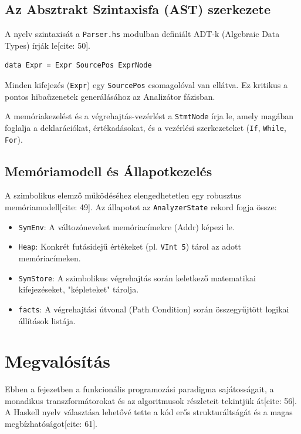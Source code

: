 \documentclass[
    hungarian,
    parspace
]{elteikthesis}
\begin{document}
\section{Az Absztrakt Szintaxisfa (AST) szerkezete}
A nyelv szintaxisát a \texttt{Parser.hs} modulban definiált ADT-k (Algebraic Data Types) írják le[cite: 50]. 

\begin{verbatim}
data Expr = Expr SourcePos ExprNode
\end{verbatim}
Minden kifejezés (\texttt{Expr}) egy \texttt{SourcePos} csomagolóval van ellátva. Ez kritikus a pontos hibaüzenetek generálásához az Analizátor fázisban.

A memóriakezelést és a végrehajtás-vezérlést a \texttt{StmtNode} írja le, amely magában foglalja a deklarációkat, értékadásokat, és a vezérlési szerkezeteket (\texttt{If}, \texttt{While}, \texttt{For}).

\section{Memóriamodell és Állapotkezelés}
A szimbolikus elemző működéséhez elengedhetetlen egy robusztus memóriamodell[cite: 49]. Az állapotot az \texttt{AnalyzerState} rekord fogja össze:
\begin{itemize}
    \item \texttt{SymEnv}: A változóneveket memóriacímekre (Addr) képezi le.
    \item \texttt{Heap}: Konkrét futásidejű értékeket (pl. \texttt{VInt 5}) tárol az adott memóriacímeken.
    \item \texttt{SymStore}: A szimbolikus végrehajtás során keletkező matematikai kifejezéseket, "képleteket" tárolja.
    \item \texttt{facts}: A végrehajtási útvonal (Path Condition) során összegyűjtött logikai állítások listája.
\end{itemize}

\chapter{Megvalósítás}
Ebben a fejezetben a funkcionális programozási paradigma sajátosságait, a monadikus transzformátorokat és az algoritmusok részleteit tekintjük át[cite: 56]. A Haskell nyelv választása lehetővé tette a kód erős strukturáltságát és a magas megbízhatóságot[cite: 61].
\end{document}
